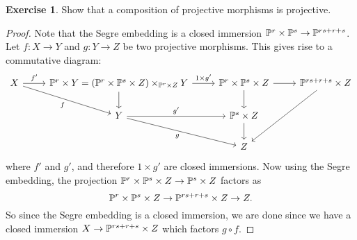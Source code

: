 \documentclass[11pt]{book}
\theoremstyle{definition}
\newtheorem{exercise}{Exercise}[section]
\begin{document}
\begin{exercise}
Show that a composition of projective morphisms is projective.
\end{exercise}
\begin{proof}
Note that the Segre embedding is a closed immersion $\P^r\times\P^s\to\P^{rs+r+s}$. Let $f:X\to Y$ and $g:Y\to Z$ be two projective morphisms. This gives rise to a commutative diagram:
\[\begin{tikzcd}
X\ar[r,"f'"]\ar[rd,swap,"f"]&\P^r\times Y=(\P^r\times\P^s\times Z)\times_{\P^r\times Z}Y\ar[d]\ar[r,"1\times g'"]&\P^r\times\P^s\times Z\ar[d]\ar[r]&\P^{rs+r+s}\times Z\ar[ldd]\\
&Y\ar[r,"g'"]\ar[rd,swap,"g"]&\P^s\times Z\ar[d]&\\
&&Z&
\end{tikzcd}\]
where $f'$ and $g'$, and therefore $1\times g'$ are closed immersions. Now using the Segre embedding, the projection $\P^r\times\P^s\times Z\to\P^s\times Z$ factors as
\[\P^r\times\P^s\times Z\to \P^{rs+r+s}\times Z\to Z.\]
So since the Segre embedding is a closed immersion, we are done since we have a closed immersion $X\to \P^{rs+r+s}\times Z$ which factors $g\circ f$.
\end{proof}
\end{document}
